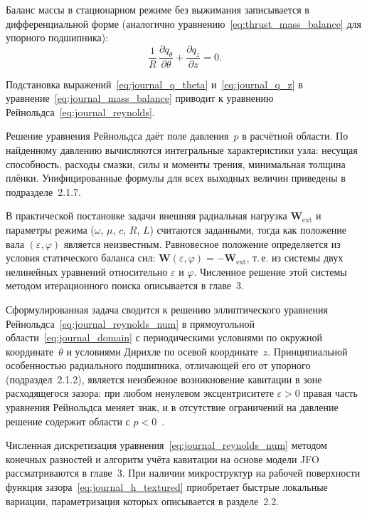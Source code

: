 Баланс массы в стационарном режиме без выжимания записывается в дифференциальной форме (аналогично уравнению~\eqref{eq:thrust_mass_balance} для упорного подшипника):
\begin{equation}
\frac{1}{R}\,\frac{\partial q_\theta}{\partial \theta} + \frac{\partial q_z}{\partial z} = 0.
\label{eq:journal_mass_balance}
\end{equation}

Подстановка выражений~\eqref{eq:journal_q_theta} и~\eqref{eq:journal_q_z} в уравнение~\eqref{eq:journal_mass_balance} приводит к уравнению Рейнольдса~\eqref{eq:journal_reynolds}.


Решение уравнения Рейнольдса даёт поле давления~$p$ в расчётной области. По найденному давлению вычисляются интегральные характеристики узла: несущая способность, расходы смазки, силы и моменты трения, минимальная толщина плёнки. Унифицированные формулы для всех выходных величин приведены в подразделе~2.1.7.

В практической постановке задачи внешняя радиальная нагрузка $\mathbf{W}_{\mathrm{ext}}$ и параметры режима ($\omega$, $\mu$, $c$, $R$, $L$) считаются заданными, тогда как положение вала $(\varepsilon, \varphi)$ является неизвестным. Равновесное положение определяется из условия статического баланса сил: $\mathbf{W}(\varepsilon, \varphi) = -\mathbf{W}_{\mathrm{ext}}$, т.\,е. из системы двух нелинейных уравнений относительно $\varepsilon$ и $\varphi$. Численное решение этой системы методом итерационного поиска описывается в главе~3.

Сформулированная задача сводится к решению эллиптического уравнения Рейнольдса~\eqref{eq:journal_reynolds_num} в прямоугольной области~\eqref{eq:journal_domain} с периодическими условиями по окружной координате~$\theta$ и условиями Дирихле по осевой координате~$z$. Принципиальной особенностью радиального подшипника, отличающей его от упорного (подраздел~2.1.2), является неизбежное возникновение кавитации в зоне расходящегося зазора: при любом ненулевом эксцентриситете $\varepsilon > 0$ правая часть уравнения Рейнольдса меняет знак, и в отсутствие ограничений на давление решение содержит области с $p < 0$~\cite{gao2014}.

Численная дискретизация уравнения~\eqref{eq:journal_reynolds_num} методом конечных разностей и алгоритм учёта кавитации на основе модели JFO рассматриваются в главе~3. При наличии микроструктур на рабочей поверхности функция зазора~\eqref{eq:journal_h_textured} приобретает быстрые локальные вариации, параметризация которых описывается в разделе~2.2.
